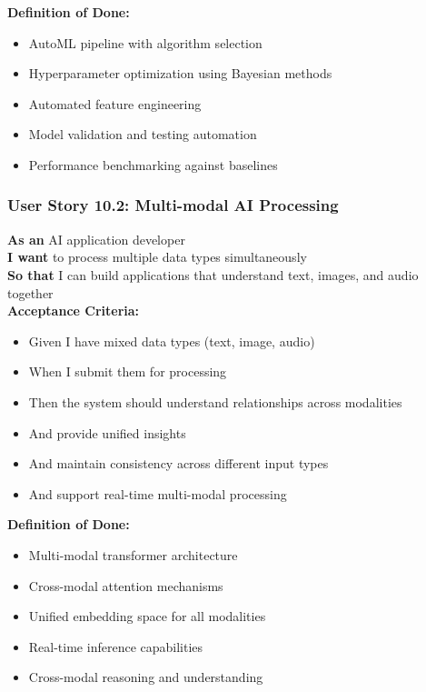 \begin{table}[H]
\begin{tcolorbox}[colback=lightgray, colframe=primaryblue, title=US-10.1: Automated Model Training]
\textbf{Definition of Done:}
\begin{itemize}
    \item AutoML pipeline with algorithm selection
    \item Hyperparameter optimization using Bayesian methods
    \item Automated feature engineering
    \item Model validation and testing automation
    \item Performance benchmarking against baselines
\end{itemize}
\end{tcolorbox}

\subsubsection{User Story 10.2: Multi-modal AI Processing}

\begin{tcolorbox}[colback=lightgray, colframe=primaryblue, title=US-10.2: Multi-modal AI Processing]
\textbf{As an} AI application developer \\
\textbf{I want} to process multiple data types simultaneously \\
\textbf{So that} I can build applications that understand text, images, and audio together \\

\textbf{Acceptance Criteria:}
\begin{itemize}
    \item Given I have mixed data types (text, image, audio)
    \item When I submit them for processing
    \item Then the system should understand relationships across modalities
    \item And provide unified insights
    \item And maintain consistency across different input types
    \item And support real-time multi-modal processing
\end{itemize}

\textbf{Definition of Done:}
\begin{itemize}
    \item Multi-modal transformer architecture
    \item Cross-modal attention mechanisms
    \item Unified embedding space for all modalities
    \item Real-time inference capabilities
    \item Cross-modal reasoning and understanding
\end{itemize}
\end{tcolorbox}


\end{table}
